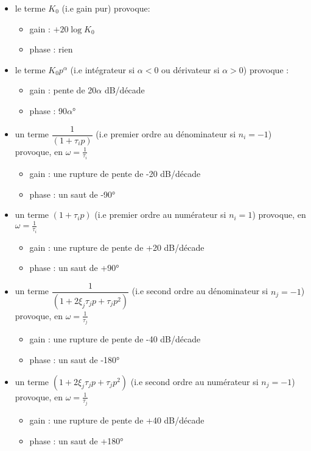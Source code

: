 \begin{itemize}
    \item le terme $K_0$ (i.e gain pur) provoque:
    \begin{itemize}
        \item gain  : $+20\log{K_0}$
        \item phase : rien 
    \end{itemize}
    \item le terme $K_0p^{\alpha}$ (i.e intégrateur si $\alpha<0$ ou 
          dérivateur si $\alpha>0$) provoque :
        \begin{itemize}
            \item gain  : pente de 20$\alpha$ dB/décade 
            \item phase : 90$\alpha$\si{\degree}
        \end{itemize}
    \item un terme $\dfrac{1}{(1+\tau_ip)}$ (i.e premier ordre au 
          dénominateur si $n_i=-1$) provoque, en $\omega=\frac{1}{\tau_i}$
        \begin{itemize}
            \item gain  : une rupture de pente de -20 dB/décade 
            \item phase : un saut de -90\si{\degree}
        \end{itemize}
    \item un terme $(1+\tau_ip)$ (i.e premier ordre au numérateur si $n_i=1$) 
          provoque, en $\omega=\frac{1}{\tau_i}$
        \begin{itemize}
            \item gain  : une rupture de pente de +20 dB/décade 
            \item phase : un saut de +90\si{\degree}
        \end{itemize}
    \item un terme $\dfrac{1}{(1+2\xi_j\tau_jp+\tau_jp^2)}$ 
          (i.e second ordre au dénominateur si $n_j=-1$) provoque, 
          en $\omega=\frac{1}{\tau_j}$
        \begin{itemize}
            \item gain  : une rupture de pente de -40 dB/décade 
            \item phase : un saut de -180\si{\degree}
        \end{itemize}
    \item un terme $(1+2\xi_j\tau_jp+\tau_jp^2)$ (i.e second ordre au 
          numérateur si $n_j=-1$) provoque, en $\omega=\frac{1}{\tau_j}$
        \begin{itemize}
            \item gain  : une rupture de pente de +40 dB/décade 
            \item phase : un saut de +180\si{\degree}
        \end{itemize}
\end{itemize}

